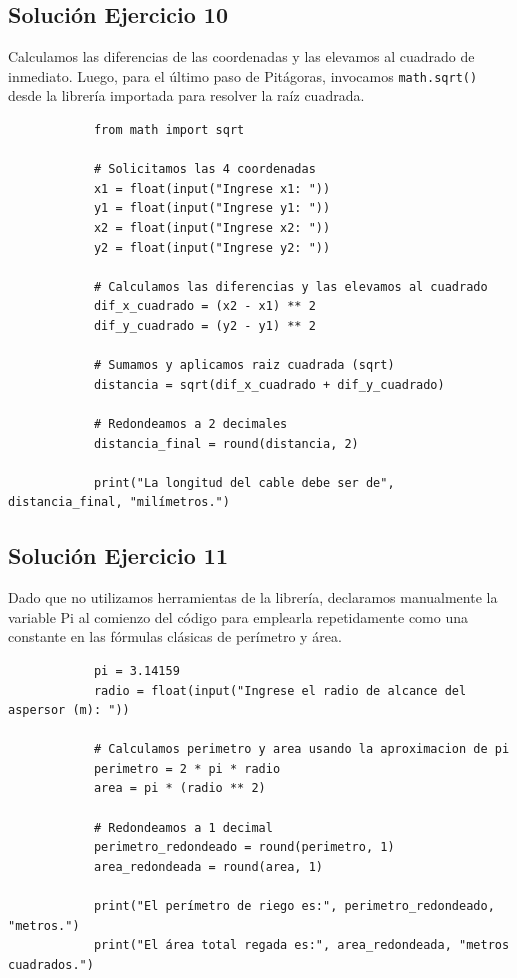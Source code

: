 \documentclass[11pt, a4paper]{article}
\begin{document}
	\subsection*{Solución Ejercicio 10}
	\begin{solucion}
		Calculamos las diferencias de las coordenadas y las elevamos al cuadrado de inmediato. Luego, para el último paso de Pitágoras, invocamos \texttt{math.sqrt()} desde la librería importada para resolver la raíz cuadrada.
		
		\begin{lstlisting}
			from math import sqrt
			
			# Solicitamos las 4 coordenadas
			x1 = float(input("Ingrese x1: "))
			y1 = float(input("Ingrese y1: "))
			x2 = float(input("Ingrese x2: "))
			y2 = float(input("Ingrese y2: "))
			
			# Calculamos las diferencias y las elevamos al cuadrado
			dif_x_cuadrado = (x2 - x1) ** 2
			dif_y_cuadrado = (y2 - y1) ** 2
			
			# Sumamos y aplicamos raiz cuadrada (sqrt)
			distancia = sqrt(dif_x_cuadrado + dif_y_cuadrado)
			
			# Redondeamos a 2 decimales
			distancia_final = round(distancia, 2)
			
			print("La longitud del cable debe ser de", distancia_final, "milímetros.")
		\end{lstlisting}
	\end{solucion}
	
	\subsection*{Solución Ejercicio 11}
	\begin{solucion}
		Dado que no utilizamos herramientas de la librería, declaramos manualmente la variable Pi al comienzo del código para emplearla repetidamente como una constante en las fórmulas clásicas de perímetro y área.
		
		\begin{lstlisting}
			pi = 3.14159
			radio = float(input("Ingrese el radio de alcance del aspersor (m): "))
			
			# Calculamos perimetro y area usando la aproximacion de pi
			perimetro = 2 * pi * radio
			area = pi * (radio ** 2)
			
			# Redondeamos a 1 decimal
			perimetro_redondeado = round(perimetro, 1)
			area_redondeada = round(area, 1)
			
			print("El perímetro de riego es:", perimetro_redondeado, "metros.")
			print("El área total regada es:", area_redondeada, "metros cuadrados.")
		\end{lstlisting}
	\end{solucion}
	
\end{document}
